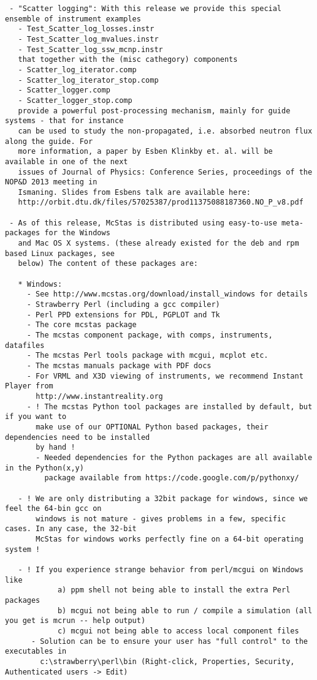 \begin{lstlisting}
 - "Scatter logging": With this release we provide this special ensemble of instrument examples
   - Test_Scatter_log_losses.instr
   - Test_Scatter_log_mvalues.instr
   - Test_Scatter_log_ssw_mcnp.instr
   that together with the (misc cathegory) components
   - Scatter_log_iterator.comp
   - Scatter_log_iterator_stop.comp
   - Scatter_logger.comp
   - Scatter_logger_stop.comp
   provide a powerful post-processing mechanism, mainly for guide systems - that for instance
   can be used to study the non-propagated, i.e. absorbed neutron flux along the guide. For
   more information, a paper by Esben Klinkby et. al. will be available in one of the next 
   issues of Journal of Physics: Conference Series, proceedings of the NOP&D 2013 meeting in
   Ismaning. Slides from Esbens talk are available here:
   http://orbit.dtu.dk/files/57025387/prod11375088187360.NO_P_v8.pdf

 - As of this release, McStas is distributed using easy-to-use meta-packages for the Windows
   and Mac OS X systems. (these already existed for the deb and rpm based Linux packages, see
   below) The content of these packages are:

   * Windows:
     - See http://www.mcstas.org/download/install_windows for details
     - Strawberry Perl (including a gcc compiler)
     - Perl PPD extensions for PDL, PGPLOT and Tk
     - The core mcstas package
     - The mcstas component package, with comps, instruments, datafiles
     - The mcstas Perl tools package with mcgui, mcplot etc.
     - The mcstas manuals package with PDF docs
     - For VRML and X3D viewing of instruments, we recommend Instant Player from
       http://www.instantreality.org
     - ! The mcstas Python tool packages are installed by default, but if you want to 
       make use of our OPTIONAL Python based packages, their dependencies need to be installed
       by hand !
       - Needed dependencies for the Python packages are all available in the Python(x,y)
       	 package available from https://code.google.com/p/pythonxy/

   - ! We are only distributing a 32bit package for windows, since we feel the 64-bin gcc on
       windows is not mature - gives problems in a few, specific cases. In any case, the 32-bit
       McStas for windows works perfectly fine on a 64-bit operating system !  

   - ! If you experience strange behavior from perl/mcgui on Windows like
       	    a) ppm shell not being able to install the extra Perl packages
            b) mcgui not being able to run / compile a simulation (all you get is mcrun -- help output)
     	    c) mcgui not being able to access local component files
	  - Solution can be to ensure your user has "full control" to the executables in
	    c:\strawberry\perl\bin (Right-click, Properties, Security, Authenticated users -> Edit)


\end{lstlisting}
